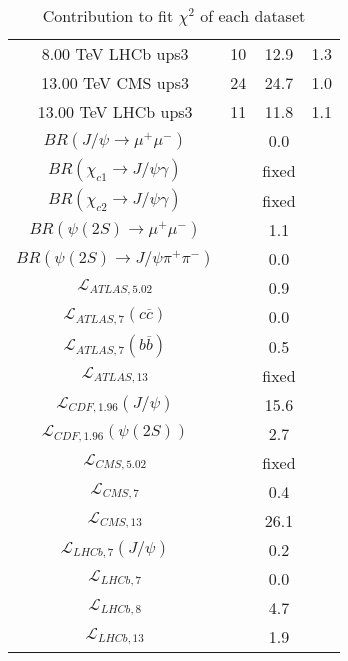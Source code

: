\begin{table}[h!]
\begin{tabular}{c|c|c|c}
8.00 TeV LHCb ups3 & 10 & 12.9 & 1.3 \\
13.00 TeV CMS ups3 & 24 & 24.7 & 1.0 \\
13.00 TeV LHCb ups3 & 11 & 11.8 & 1.1 \\
\hline
$BR(J/\psi\rightarrow\mu^+\mu^-)$ &  & 0.0 &  \\
$BR(\chi_{c1}\rightarrow J/\psi\gamma)$ &  & fixed & \\
$BR(\chi_{c2}\rightarrow J/\psi\gamma)$ &  & fixed & \\
$BR(\psi(2S)\rightarrow\mu^+\mu^-)$ &  & 1.1 &  \\
$BR(\psi(2S)\rightarrow J/\psi\pi^+\pi^-)$ &  & 0.0 &  \\
$\mathcal L_{ATLAS,5.02}$ &  & 0.9 &  \\
$\mathcal L_{ATLAS,7}(c\overline c)$ &  & 0.0 &  \\
$\mathcal L_{ATLAS,7}(b\overline b)$ &  & 0.5 &  \\
$\mathcal L_{ATLAS,13}$ &  & fixed & \\
$\mathcal L_{CDF,1.96}(J/\psi)$ &  & 15.6 &  \\
$\mathcal L_{CDF,1.96}(\psi(2S))$ &  & 2.7 &  \\
$\mathcal L_{CMS,5.02}$ &  & fixed & \\
$\mathcal L_{CMS,7}$ &  & 0.4 &  \\
$\mathcal L_{CMS,13}$ &  & 26.1 &  \\
$\mathcal L_{LHCb,7}(J/\psi)$ &  & 0.2 &  \\
$\mathcal L_{LHCb,7}$ &  & 0.0 &  \\
$\mathcal L_{LHCb,8}$ &  & 4.7 &  \\
$\mathcal L_{LHCb,13}$ &  & 1.9 &  \\
\end{tabular}
\caption{Contribution to fit $\chi^2$ of each dataset}
\end{table}
